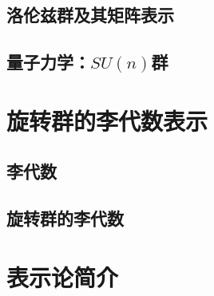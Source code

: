 \documentclass[a4paper,11pt]{ctexart}
\begin{document}
\subsection{洛伦兹群及其矩阵表示}

\subsection{量子力学：$SU(n)$群}

\section{旋转群的李代数表示}
\subsection{李代数}
\subsection{旋转群的李代数}

\section{表示论简介}
\end{document}
